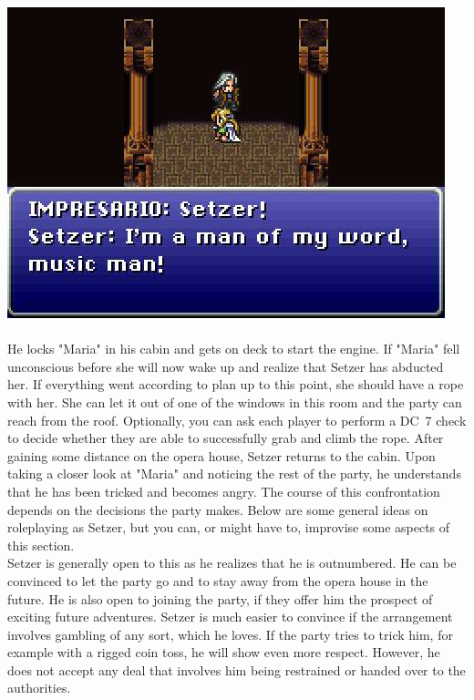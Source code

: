 %
\includegraphics[width=\columnwidth]{./art/mariaanddraco/setzer.jpg} 
%
\\\\
%
He locks "Maria" in his cabin and gets on deck to start the engine.
If "Maria" fell unconscious before she will now wake up and realize that Setzer has abducted her.
If everything went according to plan up to this point, she should have a rope with her.
She can let it out of one of the windows in this room and the party can reach from the roof. 
Optionally, you can ask each player to perform a DC~7 check to decide whether they are able to successfully grab and climb the rope.
After gaining some distance on the opera house, Setzer returns to the cabin.
Upon taking a closer look at "Maria" and noticing the rest of the party, he understands that he has been tricked and becomes angry.
The course of this confrontation depends on the decisions the party makes.
Below are some general ideas on roleplaying as Setzer, but you can, or might have to, improvise some aspects of this section.
%
\ofpar
%
\\
Setzer is generally open to this as he realizes that he is outnumbered.
He can be convinced to let the party go and to stay away from the opera house in the future.
He is also open to joining the party, if they offer him the prospect of exciting future adventures.
Setzer is much easier to convince if the arrangement involves gambling of any sort, which he loves.
If the party tries to trick him, for example with a rigged coin toss, he will show even more respect.
However, he does not accept any deal that involves him being restrained or handed over to the authorities.
